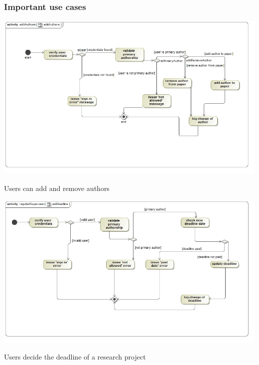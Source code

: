 \documentclass[a4paper,12pt]{report}
\begin{document}
\subsubsection{Important use cases}

\begin{flushleft}
	\includegraphics[scale=0.5]{./images/act__editAuthors__editAuthors.jpg} 
	\begin{center}
		Users can add and remove authors
	\end{center}

	\includegraphics[scale=0.5]{./images/setDeadline.jpg} 
	\begin{center}
		Users decide the deadline of a research project
	\end{center}
\end{flushleft}

\newpage
\end{document}
